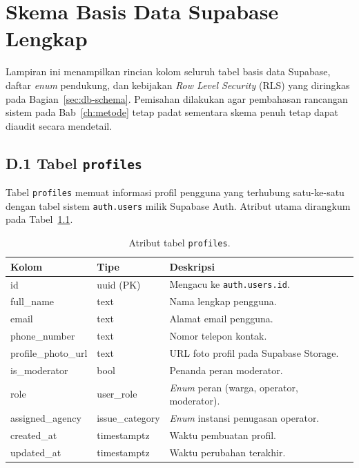 \chapter{Skema Basis Data Supabase Lengkap}
\label{app:db-schema-detail}

Lampiran ini menampilkan rincian kolom seluruh tabel basis data Supabase, daftar \textit{enum} pendukung, dan kebijakan \textit{Row Level Security} (RLS) yang diringkas pada Bagian~\ref{sec:db-schema}. Pemisahan dilakukan agar pembahasan rancangan sistem pada Bab~\ref{ch:metode} tetap padat sementara skema penuh tetap dapat diaudit secara mendetail.

\section*{D.1 Tabel \texttt{profiles}}

Tabel \texttt{profiles} memuat informasi profil pengguna yang terhubung satu-ke-satu dengan tabel sistem \texttt{auth.users} milik Supabase Auth. Atribut utama dirangkum pada Tabel~\ref{tab:profiles}.

\begin{table}[htbp]
\centering
\caption{Atribut tabel \texttt{profiles}.}
\label{tab:profiles}
\small
\begin{tabular}{p{3.4cm} p{2.6cm} p{6.5cm}}
\toprule
\textbf{Kolom} & \textbf{Tipe} & \textbf{Deskripsi} \\
\midrule
id & uuid (PK) & Mengacu ke \texttt{auth.users.id}. \\
full\_name & text & Nama lengkap pengguna. \\
email & text & Alamat email pengguna. \\
phone\_number & text & Nomor telepon kontak. \\
profile\_photo\_url & text & URL foto profil pada Supabase Storage. \\
is\_moderator & bool & Penanda peran moderator. \\
role & user\_role & \textit{Enum} peran (warga, operator, moderator). \\
assigned\_agency & issue\_category & \textit{Enum} instansi penugasan operator. \\
created\_at & timestamptz & Waktu pembuatan profil. \\
updated\_at & timestamptz & Waktu perubahan terakhir. \\
\bottomrule
\end{tabular}
\end{table}

